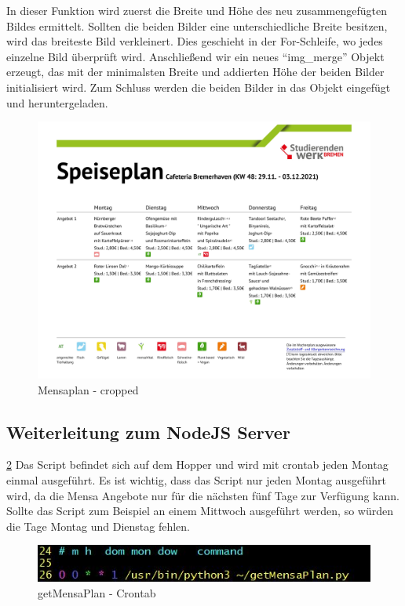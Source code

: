 In dieser Funktion wird zuerst die Breite und Höhe des neu zusammengefügten Bildes ermittelt. Sollten die beiden Bilder eine unterschiedliche Breite besitzen, wird das breiteste Bild verkleinert. Dies geschieht in der For-Schleife, wo jedes einzelne Bild überprüft wird. 
Anschließend wir ein neues ``img\_merge'' Objekt erzeugt, das mit der minimalsten Breite und addierten Höhe der beiden Bilder initialisiert wird. Zum Schluss werden die beiden Bilder in das Objekt eingefügt und heruntergeladen.

\begin{figure}[H]
    \centering
    \includegraphics[width=15cm]{Figures/AppChapter/mensa_3.png}
    \caption{Mensaplan - cropped}
    \label{fig:Mensaplan}
    \centering
\end{figure}

\subsection{Weiterleitung zum NodeJS Server}

\ref{fig:cron} Das Script befindet sich auf dem Hopper und wird mit crontab jeden Montag einmal ausgeführt. Es ist wichtig, dass das Script nur jeden Montag ausgeführt wird, da die Mensa Angebote nur für die nächsten fünf Tage zur Verfügung kann. Sollte das Script zum Beispiel an einem Mittwoch ausgeführt werden, so würden die Tage Montag und Dienstag fehlen.

\begin{figure}[H]
    \centering
    \includegraphics[width=13cm]{Figures/AppChapter/mensa_4.JPG}
    \caption{getMensaPlan - Crontab}
    \label{fig:cron}
    \centering
\end{figure}


